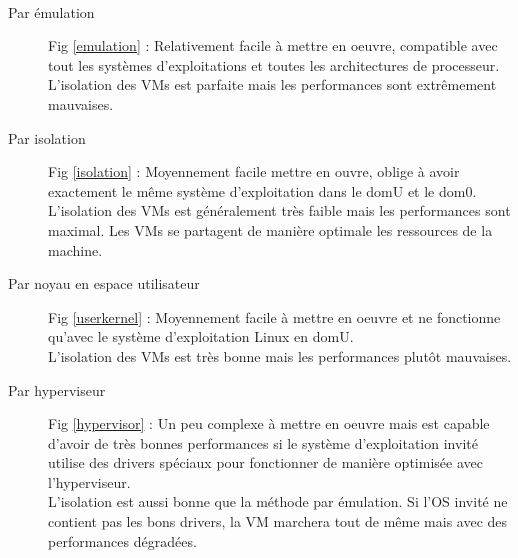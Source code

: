 \paragraph*{}
\begin{description}

	\item[Par émulation] Fig \ref{emulation} : Relativement facile à mettre en oeuvre, compatible avec tout les systèmes d'exploitations et toutes les architectures
	de processeur.\\
	L'isolation des VMs est parfaite mais les performances sont extrêmement mauvaises.

	\item[Par isolation] Fig \ref{isolation} : Moyennement facile mettre en ouvre, oblige à avoir exactement le même système d'exploitation dans le domU et le dom0.\\
	L'isolation des VMs est généralement très faible mais les performances sont maximal. Les VMs se partagent de manière optimale les ressources de la machine.

	\item[Par noyau en espace utilisateur] Fig \ref{userkernel} : Moyennement facile à mettre en oeuvre et ne fonctionne qu'avec le système d'exploitation Linux en domU.\\
	L'isolation des VMs est très bonne mais les performances plutôt mauvaises.

	\item[Par hyperviseur] Fig \ref{hypervisor} : Un peu complexe à mettre en oeuvre mais est capable d'avoir de très bonnes performances si le système d'exploitation invité
	utilise des drivers spéciaux pour fonctionner de manière optimisée avec l'hyperviseur.\\
	L'isolation est aussi bonne que la méthode par émulation. Si l'OS invité ne contient pas les bons drivers, la VM marchera tout de même mais
	avec des performances dégradées.

\end{description}

